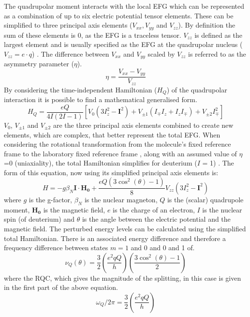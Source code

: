 The quadrupolar moment interacts with the local \ac{EFG} which can be represented as a combination of up to six electric potential tensor elements. These can be simplified to three principal axis elements ($V_{xx}, V_{yy}$ and $V_{zz}$). By definition the sum of these elements is 0, as the \ac{EFG} is a traceless tensor. $V_{zz}$ is defined as the largest element and is usually specified as the \ac{EFG} at the quadrupolar nucleus ($V_{zz} = e\cdot q$) \cite{Elliott2021WhatMedia}. The difference between $V_{xx}$ and $V_{yy}$ scaled by $V_{zz}$ is referred to as the asymmetry parameter ($\eta$).
\begin{equation}
    \eta = \frac{V_{xx}-V_{yy}}{V_{zz}}
\end{equation}
By considering the time-independent Hamiltonian ($H_Q$) of the quadrupolar interaction it is possible to find a mathematical generalised form.
\begin{equation}
    H_Q = \frac{eQ}{4I(2I-1)}[V_0(3I^2_z-\boldsymbol{I}^2) + V_{\pm1}(I_{\mp}I_z+I_zI_\mp)+V_{\pm2}I^2_\mp]
\end{equation}
$V_0$, $V_{\pm1}$ and $V_{\pm2}$ are the three principal axis elements combined to create new elements, which are complex, that better represent the total \ac{EFG}. When considering the rotational transformation from the molecule's fixed reference frame to the laboratory fixed reference frame \cite{Seelig1977DeuteriumMembranes}, along with an assumed value of $\eta$=0 (uniaxiality), the total Hamiltonian simplifies for deuterium ($I$ = 1)  \cite{Sharf1995DetectionNMR-Spectroscopy}. The form of this equation, now using its simplified principal axis elements is:
\begin{equation}
    H = -g\beta_N\boldsymbol{I}\cdot\boldsymbol{H_0} + \frac{eQ(3\cos^2(\theta)-1)}{8}V_{zz}(3I_z^2-\boldsymbol{I}^2)
\end{equation}
where $g$ is the g-factor, $\beta_N$ is the nuclear magneton, $Q$ is the (scalar) quadrupole moment, $\boldsymbol{H_0}$ is the magnetic field, $e$ is the charge of an electron, $I$ is the nuclear spin (of deuterium) and $\theta$ is the angle between the electric potential and the magnetic field. The perturbed energy levels can be calculated using the simplified total Hamiltonian. There is an associated energy difference and therefore a frequency difference between states $m=1$ and 0 and 0 and 1 of.
\begin{equation}
    \nu_Q(\theta) = \frac{3}{2}\left(\frac{e^2qQ}{h}\right)\left(\frac{3\cos^2(\theta)-1}{2}\right)
    \label{eqn:Quad:Angle}
\end{equation}
where the \ac{RQC}, which gives the magnitude of the splitting, in this case is given in the first part of the above equation.
\begin{equation}
    \omega_Q/2\pi = \frac{3}{2}\left(\frac{e^2qQ}{h}\right)
    \label{eqn:Quad:RQC}
\end{equation}

